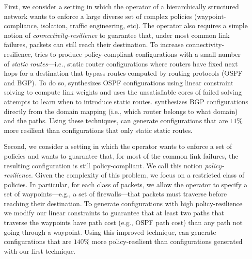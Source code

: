 First, we consider a setting in which the operator of a hierarchically
structured network wants to enforce a large diverse set of complex
policies (waypoint-compliance, isolation, traffic engineering, etc).
The operator also requires a simple notion of
\emph{connectivity-resilience} to guarantee that, under most common
link failures, packets can still reach their destination.
To increase connectivity-resilience, \name tries to produce
policy-compliant configurations with a small number of {\em static
  routes}---i.e., static router configurations where routers have
fixed next hops for a destination that bypass routes computed by routing protocols (OSPF and BGP).
To do so, \name synthesizes OSPF configurations using linear constraint solving to compute
link weights and uses the unsatisfiable cores
of failed solving attempts to learn when to introduce static routes.
\name synthesizes BGP configurations directly from the domain mapping (i.e., which router belongs to what domain) and the paths.
Using these techniques, \name can generate configurations that are
$11\%$ more resilient than configurations that only static static routes.

Second, we consider a setting in which the operator wants to enforce a
set of policies and wants to guarantee that, for most of the common
link failures, the resulting configuration is still policy-compliant.
We call this notion \emph{policy-resilience}.  Given the complexity of
this problem, we focus on a {\rm restricted class} of policies.  In
particular, for each class of packets, we allow the operator to
specify a set of waypoints---e.g., a set of firewalls---that packets
must traverse before reaching their destination.  To generate
configurations with high policy-resilience we modify our linear
constraints to guarantee that at least two paths that traverse the
waypoints have path cost (e.g., OSPF path cost) than any path not
going through a waypoint.  Using this improved technique, \name can
generate configurations that are $140\%$ more policy-resilient than
configurations generated with our first technique.

